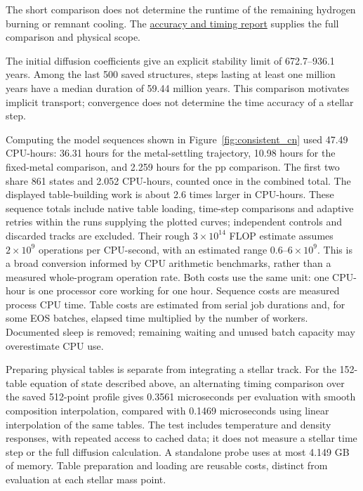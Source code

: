 \documentclass[11pt,letterpaper]{article}
\newcommand{\doc}[2]{\href{https://github.com/oklo/ember/blob/codex/atmosphere5000-density-checks/#1}{#2}}
\begin{document}
The short comparison does not determine
the runtime of the remaining hydrogen burning or remnant cooling.
The \doc{docs/PRODUCTION_ACCURACY.md}{accuracy and timing report} supplies
the full comparison and physical scope.

The initial diffusion coefficients give an explicit stability limit of
672.7--936.1 years. Among the last 500 saved structures, steps lasting at least
one million years have a median duration of 59.44 million years. This
comparison motivates implicit transport; convergence does not determine
the time accuracy of a stellar step.

Computing the model sequences shown in Figure~\ref{fig:consistent_cn}
used 47.49 CPU-hours: 36.31 hours for the metal-settling trajectory,
10.98 hours for the fixed-metal comparison, and 2.259 hours for the pp
comparison. The first two share 861 states and 2.052 CPU-hours, counted
once in the combined total. The displayed table-building work is about
2.6 times larger in CPU-hours. These sequence totals include native
table loading, time-step comparisons and adaptive retries within the runs
supplying the plotted curves; independent controls and discarded tracks are
excluded. Their rough $3\times10^{14}$ FLOP estimate assumes
$2\times10^9$ operations per CPU-second, with an estimated range
$0.6$--$6\times10^9$. This is a broad conversion informed by CPU arithmetic
benchmarks, rather than a measured whole-program operation rate.
Both costs use the same unit: one CPU-hour is one processor core working
for one hour. Sequence costs are measured process CPU time. Table costs
are estimated from serial job durations and, for some EOS batches, elapsed
time multiplied by the number of workers. Documented sleep is removed;
remaining waiting and unused batch capacity may overestimate CPU use.

Preparing physical tables is separate from integrating a stellar track.
For the 152-table equation of state described above, an alternating timing
comparison over the saved 512-point profile gives 0.3561 microseconds per
evaluation with smooth composition interpolation, compared with 0.1469
microseconds using linear interpolation of the same tables. The test includes
temperature and density responses, with repeated access to cached data;
it does not measure a stellar time step or the full diffusion calculation.
A standalone probe uses at most 4.149 GB of memory.
Table preparation and loading are reusable costs, distinct from evaluation
at each stellar mass point.
\end{document}
